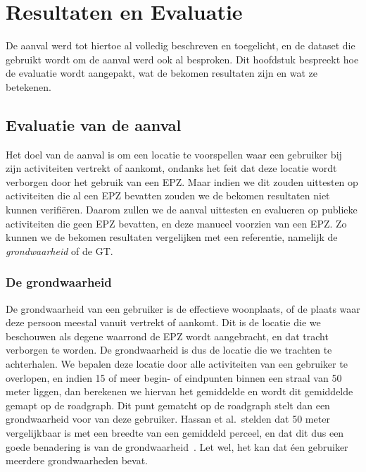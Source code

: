 \chapter{Resultaten en Evaluatie}
De aanval werd tot hiertoe al volledig beschreven en toegelicht, en de dataset
die gebruikt wordt om de aanval werd ook al besproken. Dit hoofdstuk bespreekt
hoe de evaluatie wordt aangepakt, wat de bekomen resultaten zijn en wat ze
betekenen.

\section{Evaluatie van de aanval}
Het doel van de aanval is om een locatie te voorspellen waar een gebruiker bij
zijn activiteiten vertrekt of aankomt, ondanks het feit dat deze locatie wordt
verborgen door het gebruik van een \ac{EPZ}. Maar indien we dit zouden
uittesten op activiteiten die al een \ac{EPZ} bevatten zouden we de bekomen
resultaten niet kunnen verifiëren. Daarom zullen we de aanval uittesten en
evalueren op publieke activiteiten die geen \ac{EPZ} bevatten, en deze manueel
voorzien van een \ac{EPZ}. Zo kunnen we de bekomen resultaten vergelijken met
een referentie, namelijk de \textit{grondwaarheid} of de \ac{GT}.

\subsection{De grondwaarheid}\label{sec:groundtruth}
De grondwaarheid van een gebruiker is de effectieve woonplaats, of de plaats
waar deze persoon meestal vanuit vertrekt of aankomt. Dit is de locatie die we
beschouwen als degene waarrond de \ac{EPZ} wordt aangebracht, en dat tracht
verborgen te worden. De grondwaarheid is dus de locatie die we trachten te
achterhalen. We bepalen deze locatie door alle activiteiten van een gebruiker
te overlopen, en indien 15 of meer begin- of eindpunten binnen een straal van
50 meter liggen, dan berekenen we hiervan het gemiddelde en wordt dit
gemiddelde gemapt op de roadgraph. Dit punt gematcht op de roadgraph stelt dan
een grondwaarheid voor van deze gebruiker. Hassan et al.\ stelden dat 50 meter
vergelijkbaar is met een breedte van een gemiddeld perceel, en dat dit dus een
goede benadering is van de grondwaarheid~\cite{sec18has3:online,
    Verdonck_2022}. Let wel, het kan dat éen gebruiker meerdere grondwaarheden
bevat.


